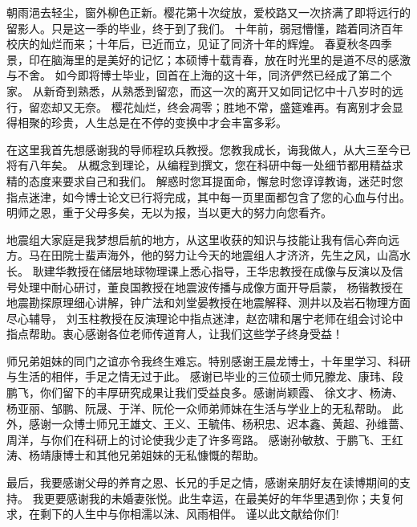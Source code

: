 

\begin{ack}
	朝雨浥去轻尘，窗外柳色正新。樱花第十次绽放，爱校路又一次挤满了即将远行的留影人。只是这一季的毕业，终于到了我们。
	十年前，弱冠懵懂，踏着同济百年校庆的灿烂而来；十年后，已近而立，见证了同济十年的辉煌。
	春夏秋冬四季景，印在脑海里的是美好的记忆；本硕博十载青春，放在时光里的是道不尽的感激与不舍。
	如今即将博士毕业，回首在上海的这十年，同济俨然已经成了第二个家。
	从新奇到熟悉，从熟悉到留恋，而这一次的离开又如同记忆中十八岁时的远行，留恋却又无奈。
	樱花灿烂，终会凋零；胜地不常，盛筵难再。有离别才会显得相聚的珍贵，人生总是在不停的变换中才会丰富多彩。

	在这里我首先想感谢我的导师程玖兵教授。您教我成长，诲我做人，从大三至今已将有八年矣。
	从概念到理论，从编程到撰文，您在科研中每一处细节都用精益求精的态度来要求自己和我们。
	解惑时您耳提面命，懈怠时您谆谆教诲，迷茫时您指点迷津，如今博士论文已行将完成，其中每一页里面都包含了您的心血与付出。
	明师之恩，重于父母多矣，无以为报，当以更大的努力向您看齐。

	地震组大家庭是我梦想启航的地方，从这里收获的知识与技能让我有信心奔向远方。马在田院士蜚声海外，他的努力让今天的地震组人才济济，先生之风，山高水长。
	耿建华教授在储层地球物理课上悉心指导，王华忠教授在成像与反演以及信号处理中耐心研讨，董良国教授在地震波传播与成像方面开导启蒙，
	杨锴教授在地震勘探原理细心讲解，钟广法和刘堂晏教授在地震解释、测井以及岩石物理方面尽心辅导，
	刘玉柱教授在反演理论中指点迷津，赵峦啸和屠宁老师在组会讨论中指点帮助。衷心感谢各位老师传道育人，让我们这些学子终身受益！

	师兄弟姐妹的同门之谊亦令我终生难忘。特别感谢王晨龙博士，十年里学习、科研与生活的相伴，手足之情无过于此。
	感谢已毕业的三位硕士师兄滕龙、康玮、段鹏飞，你们留下的丰厚研究成果让我们受益良多。感谢尚颖霞、
	徐文才、杨涛、杨亚丽、邹鹏、阮晟、于洋、阮伦一众师弟师妹在生活与学业上的无私帮助。
	此外，感谢一众博士师兄王雄文、王义、王毓伟、杨积忠、迟本鑫、黄超、孙维蔷、周洋，与你们在科研上的讨论使我少走了许多弯路。
	感谢孙敏敖、于鹏飞、王红涛、杨靖康博士和其他兄弟姐妹的无私慷慨的帮助。

	最后，我要感谢父母的养育之恩、长兄的手足之情，感谢亲朋好友在读博期间的支持。
	我更要感谢我的未婚妻张悦。此生幸运，在最美好的年华里遇到你；夫复何求，在剩下的人生中与你相濡以沫、风雨相伴。
	谨以此文献给你们!
	



\end{ack}
